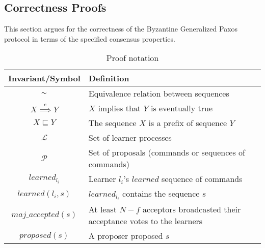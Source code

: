 \subsection{Correctness Proofs}

This section argues for the correctness of the Byzantine Generalized Paxos protocol in terms of the specified consensus properties.\par


\begin{table}[h!]
	\renewcommand{\arraystretch}{1.5}
	\centering
	\begin{tabularx}{\linewidth}{ |c|X|}
		\hline
		Invariant/Symbol & Definition \\
		\hline
		$\thicksim$ & Equivalence relation between sequences \\
		\hline
		$X \overset{e}{\implies} Y$ & $X$ implies that $Y$ is eventually true \\
		\hline
		$X \sqsubseteq Y$ & The sequence $X$ is a prefix of sequence $Y$ \\
		\hline
		$\mathcal{L}$ & Set of learner processes \\
		\hline
		$\mathcal{P}$ & Set of proposals (commands or sequences of commands) \\
		\hline
		$learned_{l_i}$ & Learner $l_i$'s $learned$ sequence of commands \\
		\hline
		$learned(l_i,s)$ & $learned_{l_i}$ contains the sequence $s$ \\
		\hline
		$maj\_accepted(s)$ & At least $N-f$ acceptors broadcasted their acceptance votes to the learners\\
		\hline
		$proposed(s)$ & A proposer proposed $s$ \\
		\hline
		
  	\end{tabularx} 
	\caption{Proof notation} 
	\label{table:1}
\end{table}

